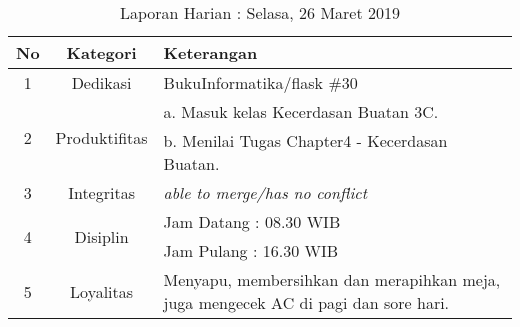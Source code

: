 \begin{table}[htp]
\begin{center}
\caption{Laporan Harian : Selasa, 26 Maret 2019}
\label{tab:lh260319}
\begin{tabularx}{\textwidth}{|l|l|X|}
\hline
\multicolumn{1}{|c|}{\textbf{No}} & \multicolumn{1}{c|}{\textbf{Kategori}} & \textbf{Keterangan} \\ \hline
\multicolumn{1}{|c|}{\multirow{1}{*}{1}} & \multicolumn{1}{c|}{\multirow{1}{*}{\parbox{2.5cm}{Dedikasi}}}
& BukuInformatika/flask \#30\\
\hline
\multicolumn{1}{|c|}{\multirow{2}{*}{2}} & \multicolumn{1}{c|}{\multirow{2}{*}{\parbox{2.5cm}{Produktifitas}}}
& a. Masuk kelas Kecerdasan Buatan 3C.\\
\multicolumn{1}{|c|}{\multirow{1}{*}{}} & \multicolumn{1}{c|}{\multirow{1}{*}{\parbox{2.5cm}{}}}
& b. Menilai Tugas Chapter4 - Kecerdasan Buatan.\\
\hline
\multicolumn{1}{|c|}{\multirow{1}{*}{3}} & \multicolumn{1}{c|}{\multirow{1}{*}{\parbox{2.5cm}{Integritas}}}
& \textit{able to merge/has no conflict} \\
\hline
\multicolumn{1}{|c|}{\multirow{2}{*}{4}} & \multicolumn{1}{c|}{\multirow{2}{*}{\parbox{2.5cm}{Disiplin}}}
& Jam Datang : 08.30 WIB \\
\multicolumn{1}{|c|}{\multirow{1}{*}{}} & \multicolumn{1}{c|}{\multirow{1}{*}{\parbox{2.5cm}{}}}
& Jam Pulang : 16.30 WIB \\
\hline
\multicolumn{1}{|c|}{\multirow{2}{*}{5}} & \multicolumn{1}{c|}{\multirow{2}{*}{\parbox{2.5cm}{Loyalitas}}}
& Menyapu, membersihkan dan merapihkan meja, juga mengecek AC di pagi dan sore hari.\\
\hline
\end{tabularx}
\end{center}
\end{table}

